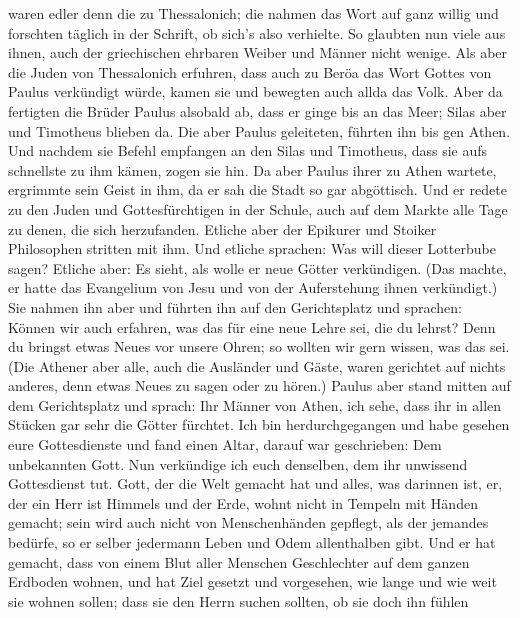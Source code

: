 waren edler denn die zu Thessalonich; die nahmen das Wort auf ganz
willig und forschten täglich in der Schrift, ob sich's also verhielte.
 So glaubten nun viele aus ihnen, auch der griechischen
ehrbaren Weiber und Männer nicht wenige.  Als aber die
Juden von Thessalonich erfuhren, dass auch zu Beröa das Wort Gottes von
Paulus verkündigt würde, kamen sie und bewegten auch allda das Volk.
 Aber da fertigten die Brüder Paulus alsobald ab, dass er
ginge bis an das Meer; Silas aber und Timotheus blieben da.
 Die aber Paulus geleiteten, führten ihn bis gen Athen. Und
nachdem sie Befehl empfangen an den Silas und Timotheus, dass sie aufs
schnellste zu ihm kämen, zogen sie hin.  Da aber Paulus
ihrer zu Athen wartete, ergrimmte sein Geist in ihm, da er sah die Stadt
so gar abgöttisch.  Und er redete zu den Juden und
Gottesfürchtigen in der Schule, auch auf dem Markte alle Tage zu denen,
die sich herzufanden.  Etliche aber der Epikurer und
Stoiker Philosophen stritten mit ihm. Und etliche sprachen: Was will
dieser Lotterbube sagen? Etliche aber: Es sieht, als wolle er neue
Götter verkündigen. (Das machte, er hatte das Evangelium von Jesu und
von der Auferstehung ihnen verkündigt.)  Sie nahmen ihn
aber und führten ihn auf den Gerichtsplatz und sprachen: Können wir auch
erfahren, was das für eine neue Lehre sei, die du lehrst? 
Denn du bringst etwas Neues vor unsere Ohren; so wollten wir gern
wissen, was das sei.  (Die Athener aber alle, auch die
Ausländer und Gäste, waren gerichtet auf nichts anderes, denn etwas
Neues zu sagen oder zu hören.)  Paulus aber stand mitten
auf dem Gerichtsplatz und sprach: Ihr Männer von Athen, ich sehe, dass
ihr in allen Stücken gar sehr die Götter fürchtet.  Ich bin
herdurchgegangen und habe gesehen eure Gottesdienste und fand einen
Altar, darauf war geschrieben: Dem unbekannten Gott. Nun verkündige ich
euch denselben, dem ihr unwissend Gottesdienst tut.  Gott,
der die Welt gemacht hat und alles, was darinnen ist, er, der ein Herr
ist Himmels und der Erde, wohnt nicht in Tempeln mit Händen gemacht;
 sein wird auch nicht von Menschenhänden gepflegt, als der
jemandes bedürfe, so er selber jedermann Leben und Odem allenthalben
gibt.  Und er hat gemacht, dass von einem Blut aller
Menschen Geschlechter auf dem ganzen Erdboden wohnen, und hat Ziel
gesetzt und vorgesehen, wie lange und wie weit sie wohnen sollen;
 dass sie den Herrn suchen sollten, ob sie doch ihn fühlen

